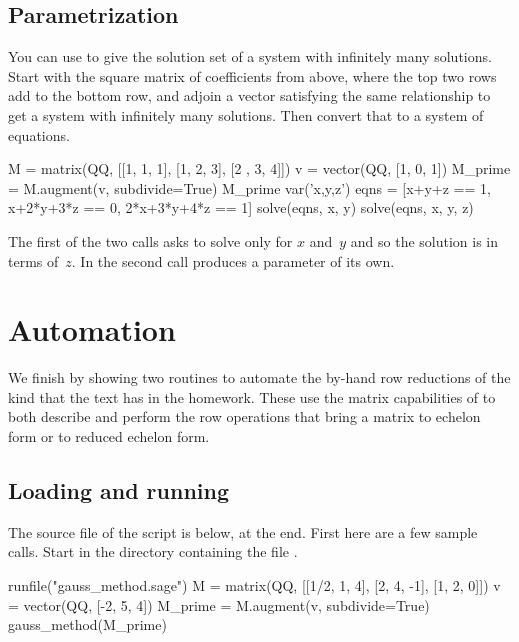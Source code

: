 \subsection{Parametrization}
You can use  to give the solution set of a system
with infinitely many solutions.
Start with the square matrix of coefficients from above,
where the top two rows add to the bottom row,
and adjoin a vector satisfying the same relationship to get
a system with infinitely many solutions.
Then convert that to a system of equations.
\begin{sageoutput}
M = matrix(QQ, [[1, 1, 1], [1, 2, 3], [2 , 3, 4]])    
v = vector(QQ, [1, 0, 1])                            
M_prime = M.augment(v, subdivide=True)               
M_prime
var('x,y,z')          
eqns = [x+y+z == 1, x+2*y+3*z == 0, 2*x+3*y+4*z == 1]
solve(eqns, x, y)   
solve(eqns, x, y, z)                                 
\end{sageoutput}
The first of the two  calls asks \Sage{} 
to solve only for $x$ and~$y$ and so the solution is in terms of~$z$.
In the second call \Sage{} produces a parameter of its own.   




\section{Automation}

We finish by showing two routines to automate the by-hand row reductions 
of the kind that the text has in the homework.
These use the matrix capabilities of \Sage{} to both describe 
and perform the row operations that bring a matrix to 
echelon form or to reduced echelon form. 

\subsection{Loading and running}
The source file of the script is below, at the end. 
First here are a few sample calls.
Start \Sage{} in the directory containing the file .
\begin{sageoutput}
runfile("gauss_method.sage")
M = matrix(QQ, [[1/2, 1, 4], [2, 4, -1], [1, 2, 0]])          
v = vector(QQ, [-2, 5, 4])
M_prime = M.augment(v, subdivide=True)  
gauss_method(M_prime)
\end{sageoutput}

